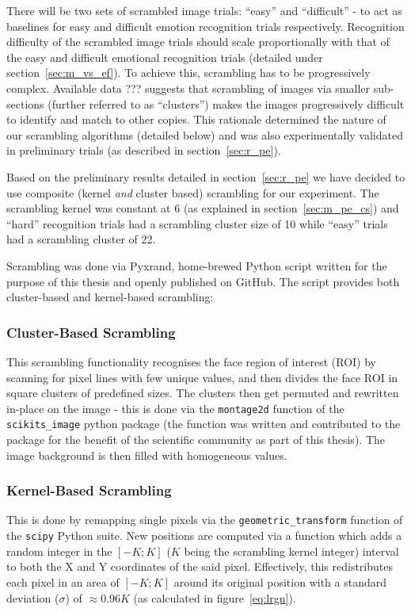 	    There will be two sets of scrambled image trials: “easy” and “difficult” - to act as baselines for easy and difficult emotion recognition trials respectively.
	    Recognition difficulty of the scrambled image trials should scale proportionally with that of the easy and difficult emotional recognition trials (detailed under section~\ref{sec:m_vs_ef}).
	    To achieve this, scrambling has to be progressively complex.
	    Available data ??? suggests that scrambling of images via smaller sub-sections (further referred to as “clusters”) makes the images progressively difficult to identify and match to other copies.
	    This rationale determined the nature of our scrambling algorithms (detailed below) and was also experimentally validated in preliminary trials (as described in section~\ref{sec:r_pe}).
	    
	    Based on the preliminary results detailed in section~\ref{sec:r_pe} we have decided to use composite (kernel \textit{and} cluster based) scrambling for our experiment.
	    The scrambling kernel was constant at \SI{6}{\pixel} (as explained in section~\ref{sec:m_pe_cs}) 
	    and “hard” recognition trials had a scrambling cluster size of \SI{10}{\pixel} while “easy” trials had a scrambling cluster of \SI{22}{\pixel}.
	    
	    Scrambling was done via Pyxrand\cite{pyxrand}, home-brewed Python script written for the purpose of this thesis and openly published on GitHub.
	    The script provides both cluster-based and kernel-based scrambling:
	    \subsubsection{Cluster-Based Scrambling}
		This scrambling functionality recognises the face region of interest (ROI) by scanning for pixel lines with few unique values, and then divides the face ROI in square clusters of predefined sizes.
		The clusters then get permuted and rewritten in-place on the image - this is done via the \colorbox{vlg}{\texttt{montage2d}} function of the \colorbox{vlg}{\texttt{scikits\_image}} python package 
		(the function was written and contributed to the package for the benefit of the scientific community as part of this thesis).
		The image background is then filled with homogeneous values.
	    \subsubsection{Kernel-Based Scrambling}\label{sec:m_vs_si_kbs}
		This is done by remapping single pixels via the \colorbox{vlg}{\texttt{geometric\_transform}} function of the \colorbox{vlg}{\texttt{scipy}} Python suite. 
		New positions are computed via a function which adds a random integer in the $[-K;K]$ ($K$ being the scrambling kernel integer) interval to both the X and Y coordinates of the said pixel.
		Effectively, this redistributes each pixel in an area of $[-K;K]$ around its original position with a standard deviation ($\sigma$) of $\approx 0.96K$ (as calculated in figure~\ref{eq:lrgn}).
